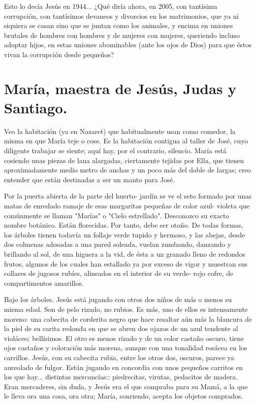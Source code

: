 \documentclass[12pt, twoside, openright]{book} %
\begin{document}
Esto lo decía Jesús en 1944... ¿Qué diría ahora, en 2005, con tantísima corrupción, con tantísimos devaneos y divorcios en los matrimonios, que ya ni siquiera se casan sino que se juntan como los animales, y encima en uniones brutales de hombres con hombres y de mujeres con mujeres, queriendo incluso adoptar hijos, en estas uniones abominables (ante los ojos de Dios) para que éstos vivan la corrupción desde pequeños?

 
\chapter*{María, maestra de Jesús, Judas y Santiago.}

Veo la habitación (ya en Nazaret) que habitualmente usan como comedor, la misma en que María teje o cose. Es la habitación contigua al taller de José, cuyo diligente trabajar se siente; aquí hay, por el contrario, silencio. María está cosiendo unas piezas de lana alargadas, ciertamente tejidas por Ella, que tienen aproximadamente medio metro de anchas y un poco más del doble de largas; creo entender que están destinadas a ser un manto para José. 

Por la puerta abierta de la parte del huerto- jardín se ve el seto formado por unas matas de enredado ramaje de esas margaritas pequeñas de color azul- violeta que comúnmente se llaman "Marías" o "Cielo estrellado". Desconozco su exacto nombre botánico. Están florecidas. Por tanto, debe ser otoño. De todas formas, los árboles tienen todavía un follaje verde tupido y hermoso, y las abejas, desde dos colmenas adosadas a una pared soleada, vuelan zumbando, danzando y brillando al sol, de una higuera a la vid, de ésta a un granado lleno de redondos frutos, algunos de los cuales han estallado ya por exceso de vigor y muestran sus collares de jugosos rubíes, alineados en el interior de su verde- rojo cofre, de compartimentos amarillos. 

Bajo los árboles. Jesús está jugando con otros dos niños de más o menos su misma edad. Son de pelo rizado, no rubios. Es más, uno de ellos es intensamente moreno: una cabecita de corderito negro que hace resaltar aún más la blancura de la piel de su carita redonda en que se abren dos ojazos de un azul tendente al violáceo; bellísimos. El otro es menos rizado y de un color castaño oscuro, tiene ojos castaños y coloración más morena, aunque con una tonalidad rosácea en los carrillos. Jesús, con su cabecita rubia, entre los otros dos, oscuros, parece ya aureolado de fulgor. Están jugando en concordia con unos pequeños carritos en los que hay... distintas mercancías:: piedrecitas, virutas, pedacitos de madera. Eran mercaderes, sin duda, y Jesús era el que compraba para su Mamá, a la que le lleva ora una cosa, ora otra; María, sonriendo, acepta los objetos comprados. 
\end{document}
